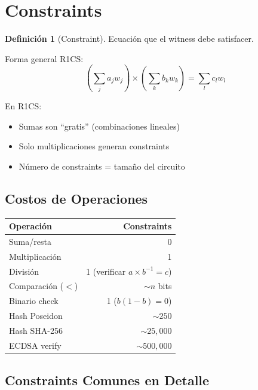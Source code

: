 \documentclass[11pt,a4paper,twoside,openright]{book}
\theoremstyle{definition}
\newtheorem{definition}{Definición}[chapter]
\theoremstyle{plain}
\theoremstyle{remark}
\begin{document}
\section{Constraints}

\begin{definition}[Constraint]
Ecuación que el witness debe satisfacer.
\end{definition}

Forma general R1CS:
\[
(\sum_j a_j w_j) \times (\sum_k b_k w_k) = \sum_l c_l w_l
\]

\begin{keyidea}
En R1CS:
\begin{itemize}
    \item Sumas son ``gratis'' (combinaciones lineales)
    \item Solo multiplicaciones generan constraints
    \item Número de constraints = tamaño del circuito
\end{itemize}
\end{keyidea}

\subsection{Costos de Operaciones}

\begin{table}[htbp]
\centering
\begin{tabular}{lr}
\toprule
\textbf{Operación} & \textbf{Constraints} \\
\midrule
Suma/resta & 0 \\
Multiplicación & 1 \\
División & 1 (verificar $a \times b^{-1} = c$) \\
Comparación ($<$) & $\sim n$ bits \\
Binario check & 1 ($b(1-b)=0$) \\
Hash Poseidon & $\sim 250$ \\
Hash SHA-256 & $\sim 25,000$ \\
ECDSA verify & $\sim 500,000$ \\
\bottomrule
\end{tabular}
\end{table}

\subsection{Constraints Comunes en Detalle}
\end{document}
